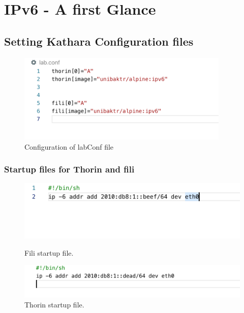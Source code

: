 \chapter{IPv6 - A ﬁrst Glance}
\label{IPv6 - A ﬁrst Glance}

\section{Setting Kathara Configuration files}
\begin{figure}[H]
\centering
  \includegraphics[width=0.9\textwidth]{images/confFile.png}
  \caption{Configuration of labConf file}
  \label{fig: 1.1}
\end{figure}

\subsection{Startup files for Thorin and fili}
\begin{figure}[H]
  \centering
  \begin{minipage}[b]{0.45\textwidth}
    \includegraphics[width=\textwidth]{images/filiStartup.png}
    \caption{Fili startup file.}
  \end{minipage}
  \hfill
  \begin{minipage}[b]{0.45\textwidth}
    \includegraphics[width=\textwidth]{images/thorinStartup.png}
    \caption{Thorin startup file.}
  \end{minipage}
\end{figure}


